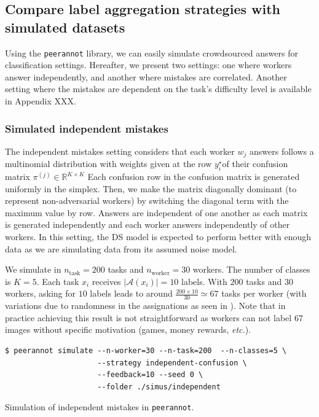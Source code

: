 \subsection{Compare label aggregation strategies with simulated datasets}
\label{subsec:simulated}

Using the \texttt{peerannot} library, we can easily simulate crowdsourced answers for classification settings.
Hereafter, we present two settings: one where workers answer independently, and another where mistakes are correlated.
Another setting where the mistakes are dependent on the task's difficulty level is available in Appendix XXX.

\subsubsection{Simulated independent mistakes}

The independent mistakes setting considers that each worker $w_j$ answers follows a multinomial distribution with weights given at the row $y_i^\star$​ of their confusion matrix $\pi^{(j)}\in\mathbb{R}^{K\times K}$ Each confusion row in the confusion matrix is generated uniformly in the simplex. Then, we make the matrix diagonally dominant (to represent non-adversarial workers) by switching the diagonal term with the maximum value by row. Answers are independent of one another as each matrix is generated independently and each worker answers independently of other workers. In this setting, the DS model is expected to perform better with enough data as we are simulating data from its assumed noise model.

We simulate in  $n_{\text{task}}=200$ tasks and $n_{\text{worker}}=30$ workers. The number of classes is $K=5$.
Each task $x_i$ receives $|\mathcal{A}(x_i)|=10$ labels. With $200$ tasks and $30$ workers, asking for $10$ labels leads to around $\frac{200\times 10}{30}\simeq 67$ tasks per worker (with variations due to randomness in the assignations as seen in ). Note that in practice achieving this result is not straightforward as workers can not label $67$ images without specific motivation (games, money rewards, \textit{etc.}).

\begin{listing}[H]
    \begin{verbatim}
$ peerannot simulate --n-worker=30 --n-task=200  --n-classes=5 \
                     --strategy independent-confusion \
                     --feedback=10 --seed 0 \
                     --folder ./simus/independent
    \end{verbatim}
    \caption{Simulation of independent mistakes in \texttt{peerannot}.}
    \label{lst:indep_mistakes}
\end{listing}

